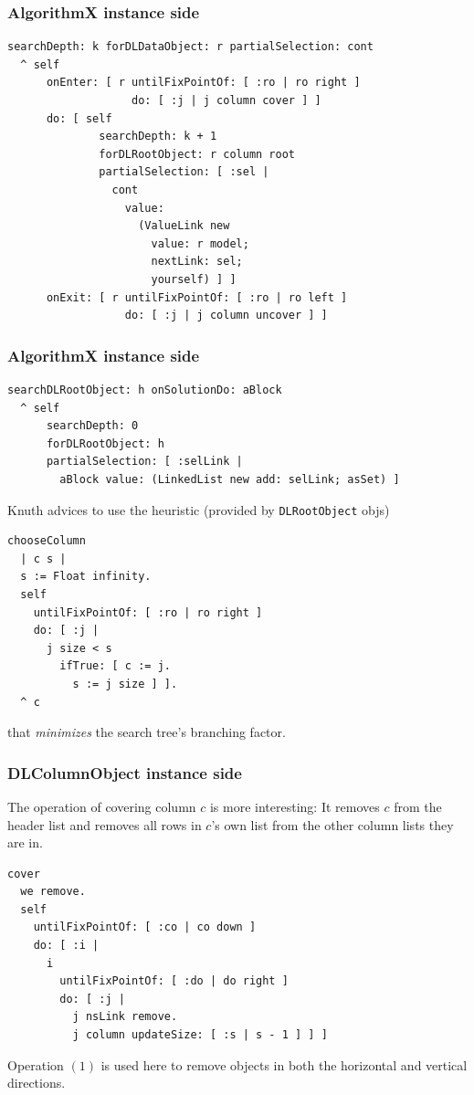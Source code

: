 \documentclass{beamer}
\begin{document}
\begin{frame}[fragile]
\frametitle{AlgorithmX instance side}
\begin{verbatim}
searchDepth: k forDLDataObject: r partialSelection: cont
  ^ self
      onEnter: [ r untilFixPointOf: [ :ro | ro right ] 
                   do: [ :j | j column cover ] ]
      do: [ self
              searchDepth: k + 1
              forDLRootObject: r column root
              partialSelection: [ :sel | 
                cont
                  value:
                    (ValueLink new
                      value: r model;
                      nextLink: sel;
                      yourself) ] ]
      onExit: [ r untilFixPointOf: [ :ro | ro left ] 
                  do: [ :j | j column uncover ] ]
\end{verbatim}
\end{frame}
  
\begin{frame}[fragile]
\frametitle{AlgorithmX instance side}
\begin{verbatim}
searchDLRootObject: h onSolutionDo: aBlock
  ^ self
      searchDepth: 0
      forDLRootObject: h
      partialSelection: [ :selLink | 
        aBlock value: (LinkedList new add: selLink; asSet) ]
\end{verbatim}
\vfill
Knuth advices to use the heuristic (provided by \texttt{DLRootObject} objs)
\begin{verbatim}
chooseColumn
  | c s |
  s := Float infinity.
  self
    untilFixPointOf: [ :ro | ro right ]
    do: [ :j | 
      j size < s
        ifTrue: [ c := j.
          s := j size ] ].
  ^ c
\end{verbatim}
that \textit{minimizes} the search tree's branching factor.
\end{frame}

\begin{frame}[fragile]
\frametitle{DLColumnObject instance side}
The operation of covering column $c$ is more interesting: 
It removes $c$ from the header list and removes all rows in $c$'s own list 
from the other column lists they are in.
\begin{verbatim}
cover
  we remove.
  self
    untilFixPointOf: [ :co | co down ]
    do: [ :i | 
      i
        untilFixPointOf: [ :do | do right ]
        do: [ :j | 
          j nsLink remove.
          j column updateSize: [ :s | s - 1 ] ] ]
\end{verbatim}
Operation $(1)$ is used here to remove objects in both the horizontal and vertical directions.
\end{frame}
\end{document}

